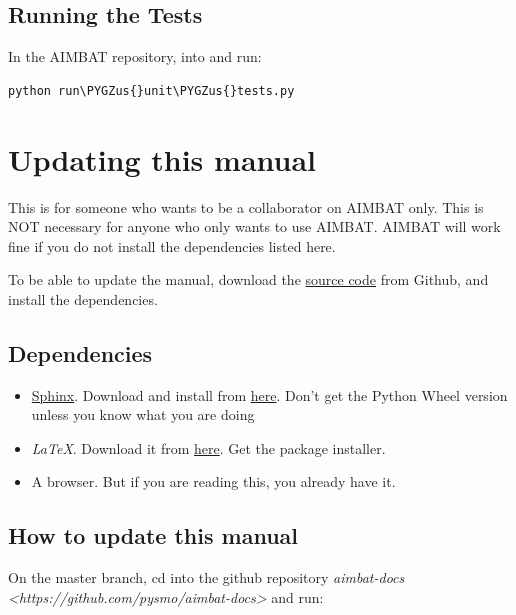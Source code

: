 \documentclass[letterpaper,10pt,english]{sphinxmanual}
\def\PYGZus{\char`\_}
\begin{document}
\section{Running the Tests}
\label{docfiles/unitTests:running-the-tests}
In the AIMBAT repository,  into  and run:

\begin{Verbatim}[commandchars=\\\{\}]
python run\PYGZus{}unit\PYGZus{}tests.py
\end{Verbatim}


\chapter{Updating this manual}
\label{docfiles/updatingThisManual:updating-this-manual}\label{docfiles/updatingThisManual::doc}
This is for someone who wants to be a collaborator on AIMBAT only. This is NOT necessary for anyone who only wants to use AIMBAT. AIMBAT will work fine if you do not install the dependencies listed here.

To be able to update the manual, download the \href{https://github.com/pysmo/aimbat-docs}{source code} from Github, and install the dependencies.


\section{Dependencies}
\label{docfiles/updatingThisManual:dependencies}\begin{itemize}
\item {} 
\href{http://sphinx-doc.org/}{Sphinx}. Download and install from \href{https://pypi.python.org/pypi/Sphinx}{here}. Don't get the Python Wheel version unless you know what you are doing

\item {} 
\emph{LaTeX}. Download it from \href{http://www.tug.org/mactex/}{here}. Get the package installer.

\item {} 
A browser. But if you are reading this, you already have it.

\end{itemize}


\section{How to update this manual}
\label{docfiles/updatingThisManual:how-to-update-this-manual}
On the master branch, cd into the github repository \emph{aimbat-docs \textless{}https://github.com/pysmo/aimbat-docs\textgreater{}} and run:
\end{document}
